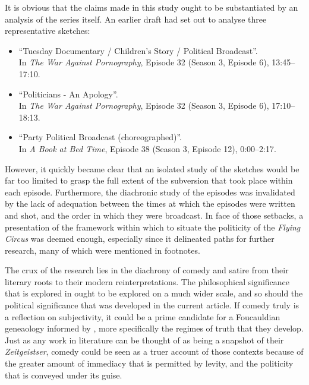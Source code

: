 \documentclass[
,a4paper
,DIV=12
,12pt
,abstract
,bibliography=totoc
]{scrartcl}
\begin{document}
It is obvious that the claims made in this study ought to be substantiated by an analysis of the series itself.  An earlier draft had set out to analyse three representative sketches:

\begin{itemize}
\item \enquote{Tuesday Documentary / Children's Story / Political Broadcast}.\\
  In \emph{The War Against Pornography},  Episode 32 (Season 3, Episode 6), 13:45--17:10.
\item \enquote{Politicians - An Apology}.\\
  In \emph{The War Against Pornography},  Episode 32 (Season 3, Episode 6), 17:10--18:13.
\item \enquote{Party Political Broadcast (choreographed)}.\\
  In \emph{A Book at Bed Time}, Episode 38 (Season 3, Episode 12), 0:00--2:17.
\end{itemize}

However, it quickly became clear that an isolated study of the sketches would be far too limited to grasp the full extent of the subversion that took place within each episode.  Furthermore, the diachronic study of the episodes was invalidated by the lack of adequation between the times at which the episodes were written and shot, and the order in which they were broadcast.  In face of those setbacks, a presentation of the framework within which to situate the politicity of the \emph{Flying Circus} was deemed enough, especially since it delineated paths for further research, many of which were mentioned in footnotes.

The crux of the research lies in the diachrony of comedy and satire from their literary roots to their modern reinterpretations.  The philosophical significance that is explored in \textcite{mcgowan2017} ought to be explored on a much wider scale, and so should the political significance that was developed in the current article.  If comedy truly is a reflection on subjectivity, it could be a prime candidate for a Foucauldian geneaology informed by \textcite{foucault1975, foucault1972}, more specifically the regimes of truth that they develop.  Just as any work in literature can be thought of as being a snapshot of their \emph{Zeitgeistser}, comedy could be seen as a truer account of those contexts because of the greater amount of immediacy that is permitted by levity, and the politicity that is conveyed under its guise.
\end{document}
